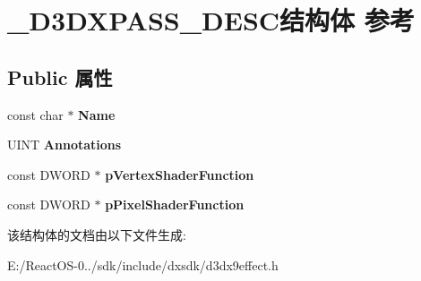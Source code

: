 \hypertarget{struct___d3_d_x_p_a_s_s___d_e_s_c}{}\section{\+\_\+\+D3\+D\+X\+P\+A\+S\+S\+\_\+\+D\+E\+S\+C结构体 参考}
\label{struct___d3_d_x_p_a_s_s___d_e_s_c}
\subsection*{Public 属性}
\begin{DoxyCompactItemize}
\item 
\mbox{\label{struct___d3_d_x_p_a_s_s___d_e_s_c_a1a017d94205d7d18b8a88ac119603a51}} 
const char $\ast$ {\bfseries Name}
\item 
\mbox{\label{struct___d3_d_x_p_a_s_s___d_e_s_c_a4f7512310b809938c841709d140e2a59}} 
U\+I\+NT {\bfseries Annotations}
\item 
\mbox{\label{struct___d3_d_x_p_a_s_s___d_e_s_c_a2ade4bd8d1b6b13234fc3aa44982ce8f}} 
const D\+W\+O\+RD $\ast$ {\bfseries p\+Vertex\+Shader\+Function}
\item 
\mbox{\label{struct___d3_d_x_p_a_s_s___d_e_s_c_a6b74fbdbc6f1a359472fa25ea3335d6d}} 
const D\+W\+O\+RD $\ast$ {\bfseries p\+Pixel\+Shader\+Function}
\end{DoxyCompactItemize}


该结构体的文档由以下文件生成\+:\begin{DoxyCompactItemize}
\item 
E\+:/\+React\+O\+S-\/0../sdk/include/dxsdk/d3dx9effect.\+h\end{DoxyCompactItemize}
